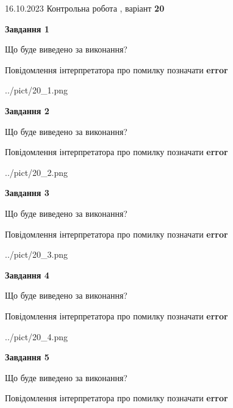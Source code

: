 \documentclass[12pt, ukrainian]{article}
\begin{document}
{\Large{16.10.2023 Контрольна робота , варіант  \No \textbf { 20 }\par}}
{
\begin {large}
{\begin {center}\textbf{Завдання 1}\end {center}}\par
Що буде виведено за виконання? \par
Повідомлення інтерпретатора про помилку позначати \textbf{error}

\begin{center}
	{../pict/20_1.png}
\end{center}
\newpage

{\begin {center}\textbf{Завдання 2}\end {center}}\par
Що буде виведено за виконання? \par
Повідомлення інтерпретатора про помилку позначати \textbf{error}

\begin{center}
	{../pict/20_2.png}
\end{center}
\newpage

{\begin {center}\textbf{Завдання 3}\end {center}}\par
Що буде виведено за виконання? \par
Повідомлення інтерпретатора про помилку позначати \textbf{error}

\begin{center}
	{../pict/20_3.png}
\end{center}
\newpage

{\begin {center}\textbf{Завдання 4}\end {center}}\par
Що буде виведено за виконання? \par
Повідомлення інтерпретатора про помилку позначати \textbf{error}

\begin{center}
	{../pict/20_4.png}
\end{center}
\newpage

{\begin {center}\textbf{Завдання 5}\end {center}}\par
Що буде виведено за виконання? \par
Повідомлення інтерпретатора про помилку позначати \textbf{error}


\end{large}}
\end{document}
